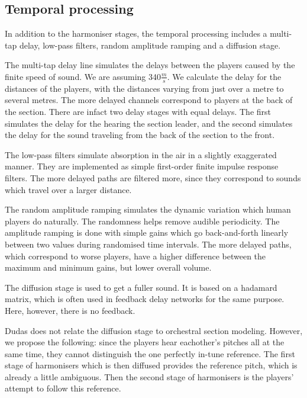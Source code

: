 \subsection{Temporal processing}
In addition to the harmoniser stages, the temporal processing includes a multi-tap delay, low-pass filters, random amplitude ramping and a diffusion stage.


The multi-tap delay line simulates the delays between the players caused by the finite speed of sound. We are assuming 340$\frac{m}{s}$. We calculate the delay for the distances of the players, with the distances varying from just over a metre to several metres. The more delayed channels correspond to players at the back of the section. There are infact two delay stages with equal delays. The first simulates the delay for the hearing the section leader, and the second simulates the delay for the sound traveling from the back of the section to the front.

The low-pass filters simulate absorption in the air in a slightly exaggerated manner. They are implemented as simple first-order finite impulse response filters. The more delayed paths are filtered more, since they correspond to sounds which travel over a larger distance.

The random amplitude ramping simulates the dynamic variation which human players do naturally. The randomness helps remove audible periodicity. The amplitude ramping is done with simple gains which go back-and-forth linearly between two values during randomised time intervals. The more delayed paths, which correspond to worse players, have a higher difference between the maximum and minimum gains, but lower overall volume.

The diffusion stage is used to get a fuller sound. It is based on a hadamard matrix, which is often used in feedback delay networks for the same purpose. Here, however, there is no feedback.

Dudas does not relate the diffusion stage to orchestral section modeling. However, we propose the following: since the players hear eachother's pitches all at the same time, they cannot distinguish the one perfectly in-tune reference. The first stage of harmonisers which is then diffused provides the reference pitch, which is already a little ambiguous. Then the second stage of harmonisers is the players' attempt to follow this reference. 
